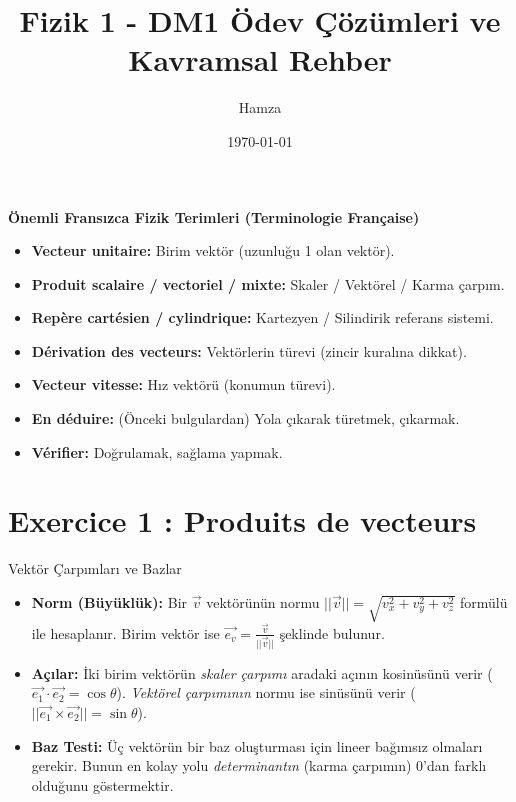 \documentclass[11pt,a4paper]{article}
\title{\textcolor{myblue}{\textbf{Fizik 1 - DM1 Ödev Çözümleri ve Kavramsal Rehber}}}
\author{Hamza}
\date{\today}
\begin{document}
\maketitle

\begin{terimbox}{\textbf{Önemli Fransızca Fizik Terimleri (Terminologie Française)}}
\begin{itemize}
    \item \textbf{Vecteur unitaire:} Birim vektör (uzunluğu 1 olan vektör).
    \item \textbf{Produit scalaire / vectoriel / mixte:} Skaler / Vektörel / Karma çarpım.
    \item \textbf{Repère cartésien / cylindrique:} Kartezyen / Silindirik referans sistemi.
    \item \textbf{Dérivation des vecteurs:} Vektörlerin türevi (zincir kuralına dikkat).
    \item \textbf{Vecteur vitesse:} Hız vektörü (konumun türevi).
    \item \textbf{En déduire:} (Önceki bulgulardan) Yola çıkarak türetmek, çıkarmak.
    \item \textbf{Vérifier:} Doğrulamak, sağlama yapmak.
\end{itemize}
\end{terimbox}

\vspace{0.5cm}

\section*{Exercice 1 : Produits de vecteurs}

\begin{theoriebox}{Vektör Çarpımları ve Bazlar}
\begin{itemize}
    \item \textbf{Norm (Büyüklük):} Bir $\vec{v}$ vektörünün normu $||\vec{v}|| = \sqrt{v_x^2 + v_y^2 + v_z^2}$ formülü ile hesaplanır. Birim vektör ise $\vec{e_v} = \frac{\vec{v}}{||\vec{v}||}$ şeklinde bulunur.
    \item \textbf{Açılar:} İki birim vektörün \textit{skaler çarpımı} aradaki açının kosinüsünü verir ($\vec{e_1} \cdot \vec{e_2} = \cos\theta$). \textit{Vektörel çarpımının} normu ise sinüsünü verir ($||\vec{e_1} \times \vec{e_2}|| = \sin\theta$).
    \item \textbf{Baz Testi:} Üç vektörün bir baz oluşturması için lineer bağımsız olmaları gerekir. Bunun en kolay yolu \textit{determinantın} (karma çarpımın) $0$'dan farklı olduğunu göstermektir.
\end{itemize}
\end{theoriebox}
\end{document}
